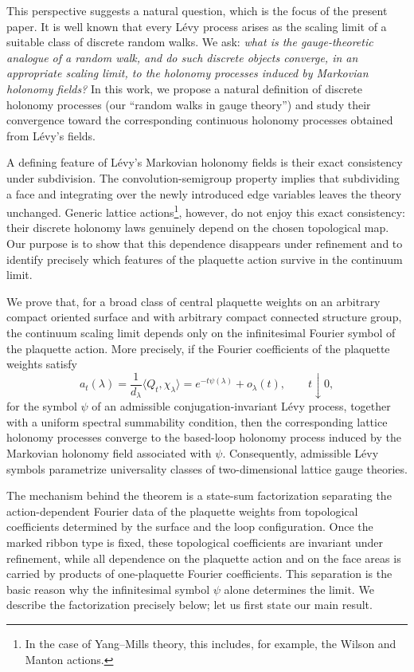 \documentclass[11pt,a4paper,reqno]{article}
\theoremstyle{definition}
\theoremstyle{remark}
\begin{document}
This perspective suggests a natural question, which is the focus of the present paper. It is well known that every L\'evy process arises as the scaling limit of a suitable class of discrete random walks. We ask: \emph{what is the gauge-theoretic analogue of a random walk, and do such discrete objects converge, in an appropriate scaling limit, to the holonomy processes induced by Markovian holonomy fields?} In this work, we propose a natural definition of discrete holonomy processes (our ``random walks in gauge theory'') and study their convergence toward the corresponding continuous holonomy processes obtained from L\'evy's fields.

A defining feature of L\'evy's Markovian holonomy fields \cite{Lev03,Lev10} is their exact consistency under subdivision. The convolution-semigroup property implies that subdividing a face and integrating over the newly introduced edge variables leaves the theory unchanged. Generic lattice actions\footnote{In the case of Yang--Mills theory, this includes, for example, the Wilson and Manton actions.}, however, do not enjoy this exact consistency: their discrete holonomy laws genuinely depend on the chosen topological map. Our purpose is to show that this dependence disappears under refinement and to identify precisely which features of the plaquette action survive in the continuum limit.

We prove that, for a broad class of central plaquette weights on an arbitrary compact oriented surface and with arbitrary compact connected structure group, the continuum scaling limit depends only on the infinitesimal Fourier symbol of the plaquette action. More precisely, if the Fourier coefficients of the plaquette weights satisfy
\[
 a_t(\lambda)=\frac{1}{d_\lambda}\langle Q_t,\chi_\lambda\rangle
 =e^{-t\psi(\lambda)}+o_\lambda(t),\qquad t\downarrow0,
\]
for the symbol $\psi$ of an admissible conjugation-invariant L\'evy process, together with a uniform spectral summability condition, then the corresponding lattice holonomy processes converge to the based-loop holonomy process induced by the Markovian holonomy field associated with $\psi$. Consequently, admissible L\'evy symbols parametrize universality classes of two-dimensional lattice gauge theories.

The mechanism behind the theorem is a state-sum factorization separating the action-dependent Fourier data of the plaquette weights from topological coefficients determined by the surface and the loop configuration. Once the marked ribbon type is fixed, these topological coefficients are invariant under refinement, while all dependence on the plaquette action and on the face areas is carried by products of one-plaquette Fourier coefficients. This separation is the basic reason why the infinitesimal symbol $\psi$ alone determines the limit. We describe the factorization precisely below; let us first state our main result.
\end{document}
